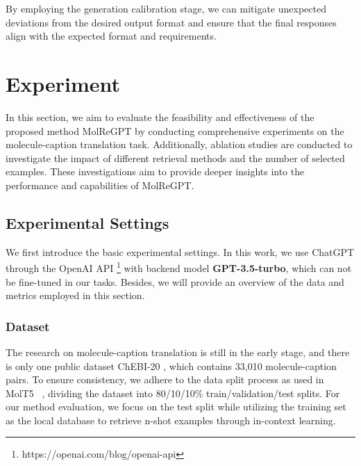 \documentclass{article}
\theoremstyle{plain}
\theoremstyle{definition}
\theoremstyle{remark}
\begin{document}
By employing the generation calibration stage, we can mitigate unexpected deviations from the desired output format and ensure that the final responses align with the expected format and requirements. \section{Experiment}
\label{sec:Experiments}
In this section, we aim to evaluate the feasibility and effectiveness of the proposed method MolReGPT by conducting comprehensive experiments on the molecule-caption translation task. 
Additionally, ablation studies are conducted to investigate the impact of different retrieval methods and the number of selected examples. These investigations aim to provide deeper insights into the performance and capabilities of MolReGPT.


\subsection{Experimental Settings}
We first introduce the basic experimental settings. In this work, we use ChatGPT through the OpenAI API \footnote{https://openai.com/blog/openai-api} with backend model \textbf{GPT-3.5-turbo}, which can not be fine-tuned in our tasks. 
Besides, we will provide an overview of the data and metrics employed in this section.

\subsubsection{Dataset}
The research on molecule-caption translation is still in the early stage, and there is only one public dataset ChEBI-20 \cite{edwards2021text2mol}, which contains 33,010 molecule-caption pairs. To ensure consistency, we adhere to the data split process as used in MolT5 ~\cite{edwards-etal-2022-translation}, dividing the dataset into 80/10/10\% train/validation/test splits. 
For our method evaluation, we focus on the test split while utilizing the training set as the local database to retrieve n-shot examples through in-context learning. 
\end{document}
